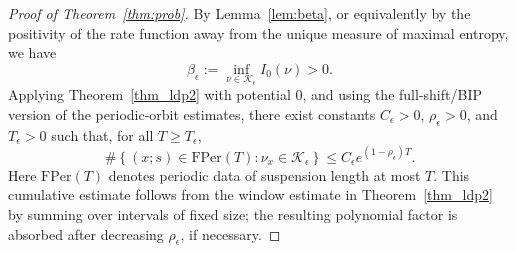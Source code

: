 \documentclass[10pt,a4paper]{amsart}
\def\ge{\geqslant}
\def\le{\leqslant}
\begin{document}
\begin{proof}[Proof of Theorem~\ref{thm:prob}]
By Lemma~\ref{lem:beta}, or equivalently by the positivity of the rate
function away from the unique measure of maximal entropy, we have
\[
\beta_\epsilon:=\inf_{\nu\in\mathcal K_\epsilon} I_0(\nu)>0.
\]
Applying Theorem~\ref{thm_ldp2} with potential \(0\), and using the
full-shift/BIP version of the periodic-orbit estimates, there exist constants
\(C_\epsilon>0\), \(\rho_\epsilon>0\), and \(T_\epsilon>0\) such that, for all
\(T\ge T_\epsilon\),
\begin{equation}\label{eq:ldp-cumulative-prob}
\#\left\{
(x;s)\in\mathrm{FPer}(T):
\nu_x\in\mathcal K_\epsilon
\right\}
\le
C_\epsilon e^{(1-\rho_\epsilon)T}.
\end{equation}
Here \(\mathrm{FPer}(T)\) denotes periodic data of suspension length at most
\(T\). This cumulative estimate follows from the window estimate in
Theorem~\ref{thm_ldp2} by summing over intervals of fixed size; the resulting
polynomial factor is absorbed after decreasing \(\rho_\epsilon\), if
necessary.


\end{proof}
\end{document}
